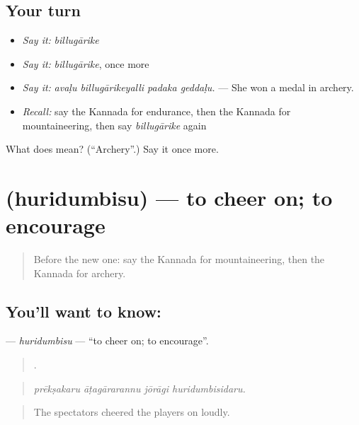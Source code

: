 \subsection*{Your turn}
\begin{itemize}
\raggedright
  \item \emph{Say it:} \emph{billugārike}
  \item \emph{Say it:} \emph{billugārike}, once more
  \item \emph{Say it:} \emph{avaḷu billugārikeyalli padaka geddaḷu.} — She won a medal in archery.
  \item \emph{Recall:} say the Kannada for endurance, then the Kannada for mountaineering, then say \emph{billugārike} again
\end{itemize}

\begin{tcolorbox}[breakable,colback=teal!4,colframe=teal!35!black,title={Before you move on}]
What does  mean? (\textquotedblleft{}Archery\textquotedblright{}.) Say it once more.
\end{tcolorbox}
\section[\texorpdfstring{\kn{ಹುರಿದುಂಬಿಸು} (huridumbisu)}{ಹುರಿದುಂಬಿಸು (huridumbisu)}]{ (huridumbisu) — to cheer on; to encourage}

\label{lesson:KA-C541-huridumbisu}



\begin{quote}
Before the new one: say the Kannada for mountaineering, then the Kannada for archery.
\end{quote}

\subsection*{You'll want to know: }
\textbf{} — \emph{huridumbisu} — \textquotedblleft{}to cheer on; to encourage\textquotedblright{}.

\begin{quote}
   .
\end{quote}

\begin{quote}
\emph{prēkṣakaru āṭagārarannu jōrāgi huridumbisidaru.}
\end{quote}

\begin{quote}
The spectators cheered the players on loudly.
\end{quote}

